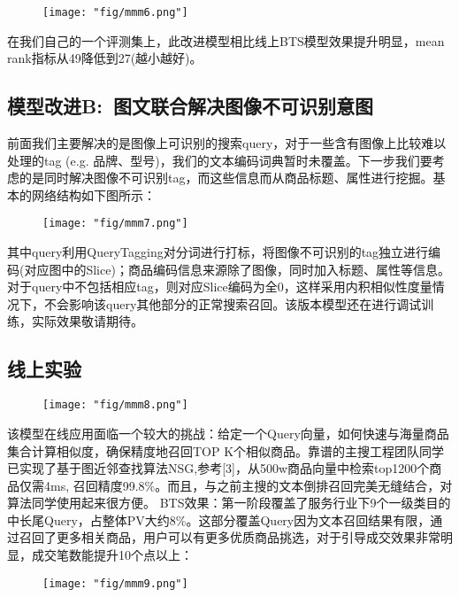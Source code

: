 \begin{figure}[!h]
	\centering
	\texttt{[image: "fig/mmm6.png"]}
	\caption{}
	\label{fig:mmm6}
\end{figure}

在我们自己的一个评测集上，此改进模型相比线上BTS模型效果提升明显，mean rank指标从49降低到27(越小越好)。
 
\subsection{模型改进B: 图文联合解决图像不可识别意图}
前面我们主要解决的是图像上可识别的搜索query，对于一些含有图像上比较难以处理的tag (e.g. 品牌、型号)，我们的文本编码词典暂时未覆盖。下一步我们要考虑的是同时解决图像不可识别tag，而这些信息而从商品标题、属性进行挖掘。基本的网络结构如下图所示： 

\begin{figure}[!h]
	\centering
	\texttt{[image: "fig/mmm7.png"]}
	\caption{}
	\label{fig:mmm7}
\end{figure}

其中query利用QueryTagging对分词进行打标，将图像不可识别的tag独立进行编码(对应图中的Slice)；商品编码信息来源除了图像，同时加入标题、属性等信息。对于query中不包括相应tag，则对应Slice编码为全0，这样采用内积相似性度量情况下，不会影响该query其他部分的正常搜索召回。该版本模型还在进行调试训练，实际效果敬请期待。
\subsection{线上实验 }
\begin{figure}[!h]
	\centering
	\texttt{[image: "fig/mmm8.png"]}
	\caption{}
	\label{fig:mmm8}
\end{figure}
该模型在线应用面临一个较大的挑战：给定一个Query向量，如何快速与海量商品集合计算相似度，确保精度地召回TOP K个相似商品。靠谱的主搜工程团队同学已实现了基于图近邻查找算法NSG,参考[3]，从500w商品向量中检索top1200个商品仅需4ms, 召回精度99.8\%。而且，与之前主搜的文本倒排召回完美无缝结合，对算法同学使用起来很方便。
BTS效果：第一阶段覆盖了服务行业下9个一级类目的中长尾Query，占整体PV大约8\%。这部分覆盖Query因为文本召回结果有限，通过召回了更多相关商品，用户可以有更多优质商品挑选，对于引导成交效果非常明显，成交笔数能提升10个点以上：  
\begin{figure}[!h]
	\centering
	\texttt{[image: "fig/mmm9.png"]}
	\caption{}
	\label{fig:mmm9}
\end{figure}


